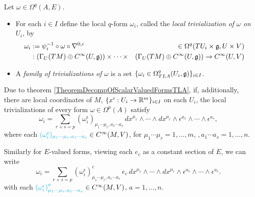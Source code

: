 \begin{definition}\label{definitionLocalTrivializationOfEValuedForms}
Let $\omega \in \Omega^q(A, E)$.
    \begin{itemize}
    
    \item For each $i \in I$ define the local $q$-form $\omega_i$, called the \emph{local trivialization of $\omega$ on $U_i$}, by
    \begin{align}
        \omega_i &:= \psi_i^{-1} \circ \omega \circ \nabla^{0, i}  & \in \Omega^q(TU_i\times \mathfrak{g}, U \times V)\\
        &:\left( \Gamma_U(TM)\oplus C^\infty(U, \mathfrak{g}) \right) \times \cdots \times &\left( \Gamma_U(TM)\oplus C^\infty(U, \mathfrak{g}) \right) \to C^\infty(U, V)
    \end{align}
    
    \item A \emph{family of trivializations of $\omega$} is a set $\{\omega_i \in \Omega^q_{TLA}(U_i, \mathfrak{g})\}_{i \in I}$.
    
    \end{itemize}

\end{definition}

\begin{remark} \label{remarkLocalDecompositionOfFormsOnTransitiveLieAlgebroidsIfTrivializationOfM}
Due to theorem \ref{TheoremDecompOfScalarValuedFormsTLA}, if, additionally, there are local coordinates of $M$, $\{x^i: U_i \to \mathbb{R}^m\}_{i \in I}$ on each $U_i$, the local trivializations of every form $\omega \in \Omega^p(A)$ satisfy \begin{equation}
    \omega_i = \sum_{r + s = p} (\omega_i^\epsilon)_{\mu_1 \cdots \mu_r, a_1 \cdots a_s}\, dx^{\mu_1} \wedge \cdots \wedge dx^{\mu_r} \wedge \epsilon^{a_1} \wedge \cdots \wedge \epsilon^{a_s},
\end{equation}
where each $\lbtext{(\omega_i^\epsilon)_{\mu_1 \cdots \mu_r, a_1 \cdots a_s}} \in C^\infty(M, V)$, for $\mu_1 \cdots \mu_r = 1, \dots, m$, $, a_1 \cdots a_s = 1, \dots, n$. 

Similarly for $E$-valued forms, viewing each $e_c$ as a constant section of $E$, we can write
\begin{equation}
    \omega_i = \sum_{r + s = p} \left(\omega_i^\epsilon\right)^c_{\mu_1 \cdots \mu_r, a_1 \cdots a_s}\, e_c \, dx^{\mu_1} \wedge \cdots \wedge dx^{\mu_r} \wedge \epsilon^{a_1} \wedge \cdots \wedge \epsilon^{a_s}.
\end{equation} 
with each $\lbtext{\left(\omega_i^\epsilon\right)^a_{\mu_1 \cdots \mu_r, a_1 \cdots a_s}} \in C^\infty(M, V)$, $a = 1, \dots, n$.
\end{remark}

